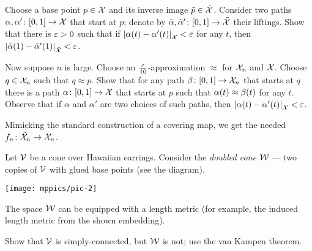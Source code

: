 Choose a base point $p\in \mathcal{X}$ and its inverse image $\tilde p\in \tilde{\mathcal{X}}$.
Consider two paths $\alpha,\alpha'\colon[0,1]\to \mathcal{X}$ that start at $p$;
denote by $\tilde \alpha,\tilde \alpha'\:[0,1]\z\to \tilde{\spc{X}}$ their liftings.
Show that there is $\varepsilon>0$ such that if $\dist{\alpha(t)}{\alpha'(t)}{\spc{X}}<\eps$ for any $t$, then $\dist{\tilde \alpha(1)}{\tilde \alpha'(1)}{\tilde{\spc{X}}}<\eps$.

Now suppose $n$ is large.
Choose an $\tfrac{\varepsilon}{10}$-approximation $\approx$ for $\mathcal{X}_n$ and $\mathcal{X}$.
Choose $q\in\mathcal{X}_n$ such that $q\approx p$.
Show that for any path $\beta\colon[0,1]\to \mathcal{X}_n$ that starts at $q$ there is a path $\alpha\colon[0,1]\to \mathcal{X}$ that starts at $p$ such that $\alpha(t)\z\approx\beta(t)$ for any $t$.
Observe that if $\alpha$ and $\alpha'$ are two choices of such paths, then $\dist{\alpha(t)}{\alpha'(t)}{\spc{X}}<\eps$.

Mimicking the standard construction of a covering map, we get the needed $f_n\colon\tilde{\mathcal{X}}_n\to \mathcal{X}_n$.



Let $\mathcal{V}$ be a cone over Hawaiian earrings.
Consider the \textit{doubled cone} $\mathcal{W}$ --- two copies of $\mathcal{V}$ with glued base points (see the diagram).

\begin{Figure}
\vskip-0mm
\centering
\texttt{[image: mppics/pic-2]}
\end{Figure}

The space $\mathcal{W}$ can be equipped with a length metric
(for example, the induced length metric from the shown embedding).

Show that $\mathcal{V}$ is simply-connected, but $\mathcal{W}$ is not; use the van Kampen theorem.

